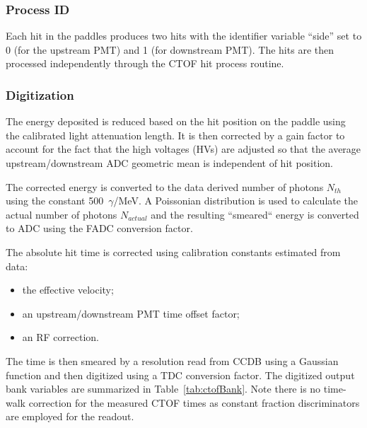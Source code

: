 \subsubsection{Process ID}

Each hit in the paddles produces two hits with the identifier variable ``side'' set to 0 (for the upstream PMT) and 1
(for downstream PMT). The hits are then processed independently through the CTOF hit process routine.

\subsubsection{Digitization}

The energy deposited is reduced based on the hit position on the paddle using the calibrated light attenuation length.
It is then corrected by a gain factor to account for the fact that the high voltages (HVs) are adjusted so that
the average upstream/downstream ADC geometric mean is independent of hit position.

The corrected energy is converted to the data derived number of photons $N_{th}$ using the constant 500~$\gamma$/MeV.
A Poissonian distribution is used to calculate the actual number of photons $N_{actual}$ and the resulting ``smeared``
energy is converted to ADC using the FADC conversion factor.

The absolute hit time is corrected using calibration constants estimated from data:

\begin{itemize}
	\item the effective velocity;
	\item an upstream/downstream PMT time offset factor;
	\item an RF correction.
\end{itemize}

The time is then smeared by a resolution read from CCDB using a Gaussian function and then digitized using a TDC
conversion factor. The digitized output bank variables are summarized in Table~\ref{tab:ctofBank}. Note there is no
time-walk correction for the measured CTOF times as constant fraction discriminators are employed for the readout.

